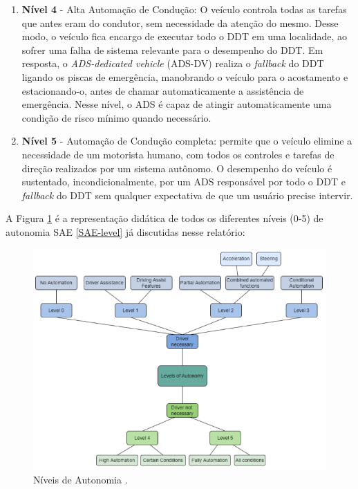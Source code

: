 \begin{enumerate}
\item \textbf{Nível 4} - Alta Automação de Condução: O veículo controla todas as tarefas 
que antes eram do condutor, sem necessidade da atenção do mesmo. Desse modo, o veículo fica encargo de executar todo o DDT em uma localidade, ao sofrer uma falha de sistema relevante para o desempenho do DDT. Em resposta, o \textit{ADS-dedicated vehicle} (ADS-DV) realiza o \textit{fallback} do DDT ligando os piscas de emergência, manobrando o veículo para o acostamento e estacionando-o, antes de chamar automaticamente a assistência de emergência. Nesse  nível, o ADS é capaz de atingir automaticamente uma condição de risco mínimo quando necessário.

\item \textbf{Nível 5} - Automação de Condução completa: permite que o veículo elimine a necessidade de um motorista humano, com todos os controles e tarefas de direção realizados por um sistema autônomo. O desempenho do veículo é sustentado, incondicionalmente, por um ADS responsável por todo o DDT e \textit{fallback} do DDT sem qualquer expectativa de que um usuário precise intervir.

\end{enumerate}

A Figura \ref{niveis-auto} é a representação didática de todos os diferentes níveis (0-5) de autonomia SAE \ref{SAE-level} já discutidas nesse relatório:

\begin{figure}[H]
\centering
\includegraphics[width=\textwidth]{Figures/level-auto.png}
\caption{Níveis de Autonomia \cite{review-auto}.}
\label{niveis-auto}
\end{figure}

